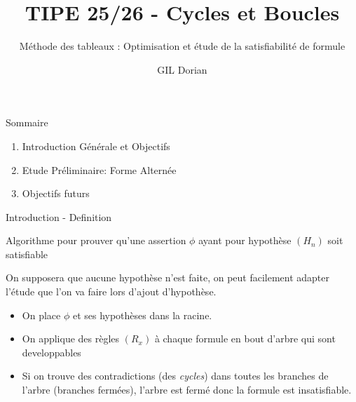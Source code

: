 \documentclass[]{beamer}
\title{TIPE 25/26 - Cycles et Boucles}
\author{GIL Dorian}
\subtitle{Méthode des tableaux : Optimisation et étude de la satisfiabilité de formule}
\date{}
\begin{document}
\begin{frame}
\titlepage
\end{frame}

\begin{frame}{Sommaire}
\begin{enumerate}
    \item Introduction Générale et Objectifs
    \item Etude Préliminaire: Forme Alternée
   
    \item Objectifs futurs
\end{enumerate}
\end{frame}

\begin{frame}{Introduction - Definition}
    \begin{definition}
        Algorithme pour prouver qu'une assertion $\phi$ ayant pour hypothèse $(H_n)$ soit satisfiable
    \end{definition}
    On supposera que aucune hypothèse n'est faite, on peut facilement adapter l'étude que l'on va faire lors d'ajout d'hypothèse.
    \pause
    \begin{itemize}
        \item On place $\phi$ et ses hypothèses dans la racine.
        \item On applique des règles $(R_x)$ à chaque formule en bout d'arbre qui sont developpables
        \item Si on trouve des contradictions (des \textit{cycles}) dans toutes les branches de l'arbre (branches fermées), l'arbre est fermé donc la formule est insatisfiable.
    \end{itemize}
    \pause
\end{frame}
\end{document}

